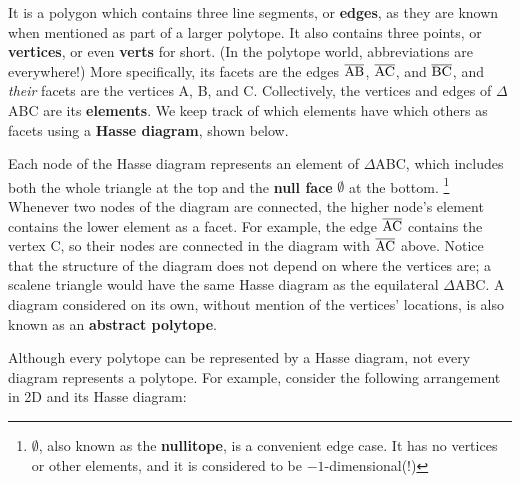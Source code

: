 \documentclass{article}
\begin{document}
It is a polygon which contains three line segments,
or \textbf{edges}, as they are known
when mentioned as part of a larger polytope.
It also contains three points, or \textbf{vertices},
or even \textbf{verts} for short.
(In the polytope world, abbreviations are everywhere!)
More specifically, its facets are the edges
$\overline{\rm AB}$, $\overline{\rm AC}$, and $\overline{\rm BC}$,
and \textit{their} facets are the vertices A, B, and C.
Collectively, the vertices and edges of $\Delta$ABC are its \textbf{elements}.
We keep track of which elements have which others as facets using a \textbf{Hasse diagram},
shown below.

\begin{center}
\end{center}

Each node of the Hasse diagram represents an element of $\Delta$ABC,
which includes both the whole triangle at the top
and the \textbf{null face} $\emptyset$ at the bottom.
\footnote{$\emptyset$, also known as the \textbf{nullitope}, is a convenient edge case.
It has no vertices or other elements,
and it is considered to be $-1$-dimensional(!)}
Whenever two nodes of the diagram are connected,
the higher node's element contains the lower element as a facet.
For example, the edge $\overline{\rm AC}$ contains the vertex C,
so their nodes are connected in the diagram with $\overline{\rm AC}$ above.
Notice that the structure of the diagram does not depend on where the vertices are;
a scalene triangle would have the same Hasse diagram as the equilateral $\Delta$ABC.
A diagram considered on its own, without mention of the vertices' locations,
is also known as an \textbf{abstract polytope}.

Although every polytope can be represented by a Hasse diagram,
not every diagram represents a polytope.
For example, consider the following arrangement in 2D and its Hasse diagram:
\end{document}
